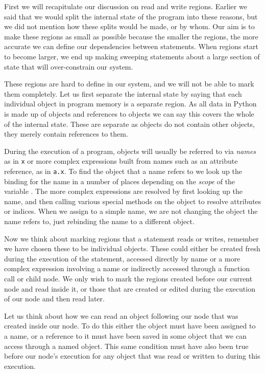 \documentclass[twoside,a4paper]{report}
\begin{document}
First we will recapitulate our discussion on read and write regions. Earlier we said that we would split the internal state of the program into these reasons,
but we did not mention how these splits would be made, or by whom. Our aim is to make these regions as small as possible because the smaller the regions, the
more accurate we can define our dependencies between statements. When regions start to become larger, we end up making sweeping statements about a large section
of state that will over-constrain our system.

These regions are hard to define in our system, and we will not be able to mark them completely. Let us first separate the internal state by saying that each
individual object in program memory is a separate region. As all data in Python is made up of objects and references to objects \cite{datamodel} we can say
this covers the whole of the internal state. These are separate as objects do not contain other objects, they merely contain references to them.

During the execution of a program, objects will usually be referred to via \textit{names} as in \texttt{x} or more complex expressions built from names such
as an attribute reference, as in \texttt{a.x}. To find the object that a name refers to we look up the binding for the name in a number of places depending
on the \textit{scope} of the variable \cite{namebinding}. The more complex expressions are resolved by first looking up the name, and then calling various
special methods on the object to resolve attributes or indices. When we assign to a simple name, we are not changing the object the name refers to, just
rebinding the name to a different object.

Now we think about marking regions that a statement reads or writes, remember we have chosen these to be individual objects. These could either be created
fresh during the execution of the statement, accessed directly by name or a more complex expression involving a name or indirectly accessed through a
function call or child node. We only wish to mark the regions created before our current node and read inside it, or those that are created or edited
during the execution of our node and then read later.

Let us think about how we can read an object following our node that was created inside our node. To do this either the object must have been assigned to a
name, or a reference to it must have been saved in some object that we can access through a named object. This same condition must have also been true before
our node's execution for any object that was read or written to during this execution.
\end{document}
